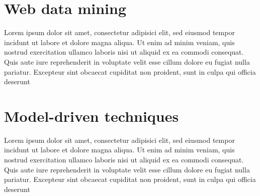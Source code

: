 \section{Web data mining}

Lorem ipsum dolor sit amet, consectetur adipisici elit, sed eiusmod tempor incidunt ut labore et dolore magna aliqua.
Ut enim ad minim veniam, quis nostrud exercitation ullamco laboris nisi ut aliquid ex ea commodi consequat. Quis aute iure reprehenderit in voluptate velit esse cillum dolore eu fugiat nulla pariatur. Excepteur sint obcaecat cupiditat non proident, sunt in culpa qui officia deserunt

\section{Model-driven techniques}

Lorem ipsum dolor sit amet, consectetur adipisici elit, sed eiusmod tempor incidunt ut labore et dolore magna aliqua.
Ut enim ad minim veniam, quis nostrud exercitation ullamco laboris nisi ut aliquid ex ea commodi consequat. Quis aute iure reprehenderit in voluptate velit esse cillum dolore eu fugiat nulla pariatur. Excepteur sint obcaecat cupiditat non proident, sunt in culpa qui officia deserunt

